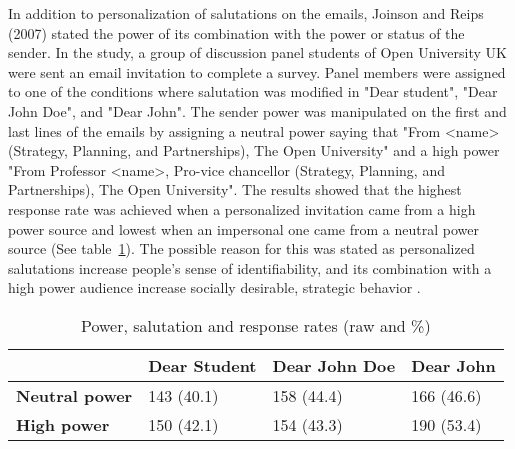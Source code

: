 In addition to personalization of salutations on the emails, Joinson and Reips (2007) stated the power of its combination with the power or status of the sender. In the study, a group of discussion panel students of Open University UK were sent an email invitation to complete a survey. Panel members were assigned to one of the conditions where salutation was modified in "Dear student", "Dear John Doe", and "Dear John". The sender power was manipulated on the first and last lines of the emails by assigning a neutral power saying that "From <name> (Strategy, Planning, and Partnerships), The Open University" and a high power "From Professor <name>, Pro-vice chancellor (Strategy, Planning, and Partnerships), The Open University". The results showed that the highest response rate was achieved when a personalized invitation came from a high power source and lowest when an impersonal one came from a neutral power source (See table~\ref{tab:pow_sal_res}). The possible reason for this was stated as personalized salutations increase people's sense of identifiability,  and its combination with a high power audience increase socially desirable, strategic behavior \cite{Joinson2007}.

\begin{table}[!ht]
\begin{center}
	\caption[]{Power, salutation and response rates (raw and \%) \cite{Joinson2007}} \label{tab:pow_sal_res}
    \begin{tabular}{ p{3cm} p{3cm}  p{3cm}  p{3cm} }
	\hline
	& \textbf{Dear Student} & \textbf{Dear John Doe} & \textbf{Dear John} \\ \hline
	\textbf{Neutral power} & 143 (40.1) & 158 (44.4) & 166 (46.6) \\
	\textbf{High power} & 150 (42.1) & 154 (43.3) & 190 (53.4) \\ \hline
    \end{tabular}
\end{center}
\end{table}

